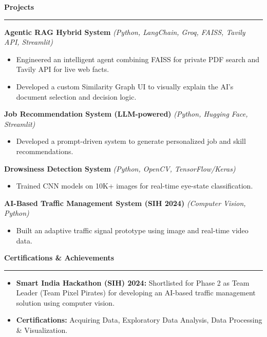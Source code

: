 \documentclass[9pt, letterpaper]{article}
\newcommand{\sectionheading}[1]{%
    \vspace{4pt}%
    {\large \textbf{#1}}%
    \vspace{1pt}%
    \hrule
    \vspace{2pt}%
}
\begin{document}
\sectionheading{Projects}
\textbf{Agentic RAG Hybrid System} \textit{(Python, LangChain, Groq, FAISS, Tavily API, Streamlit)}
\begin{itemize}[leftmargin=0.25in, itemindent=-0.15in, label={--}]
    \item Engineered an intelligent agent combining FAISS for private PDF search and Tavily API for live web facts.
    \item Developed a custom Similarity Graph UI to visually explain the AI’s document selection and decision logic.
\end{itemize}
\textbf{Job Recommendation System (LLM-powered)} \textit{(Python, Hugging Face, Streamlit)}
\begin{itemize}[leftmargin=0.25in, itemindent=-0.15in, label={--}]
    \item Developed a prompt-driven system to generate personalized job and skill recommendations.
\end{itemize}
\textbf{Drowsiness Detection System} \textit{(Python, OpenCV, TensorFlow/Keras)}
\begin{itemize}[leftmargin=0.25in, itemindent=-0.15in, label={--}]
    \item Trained CNN models on 10K+ images for real-time eye-state classification.
\end{itemize}
\textbf{AI-Based Traffic Management System (SIH 2024)} \textit{(Computer Vision, Python)}
\begin{itemize}[leftmargin=0.25in, itemindent=-0.15in, label={--}]
    \item Built an adaptive traffic signal prototype using image and real-time video data.
\end{itemize}

\sectionheading{Certifications \& Achievements}
\begin{itemize}[leftmargin=0.25in, itemindent=-0.15in, label={--}]
    \item \textbf{Smart India Hackathon (SIH) 2024:} Shortlisted for Phase 2 as Team Leader (Team Pixel Pirates) for developing an AI-based traffic management solution using computer vision.
    \item \textbf{Certifications:} Acquiring Data, Exploratory Data Analysis, Data Processing \& Visualization.
\end{itemize}
\end{document}
